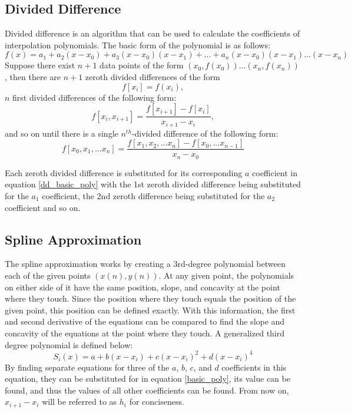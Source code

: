 \documentclass[12pt, letterpaper]{article} %
\begin{document}
\subsection{Divided Difference}
Divided difference is an algorithm that can be used to calculate the coefficients of interpolation polynomials. The basic form of the polynomial is as follows:
\begin{equation}
f(x) = a_1 + a_2(x - x_0) + a_3(x - x_0)(x - x_1) + ... + a_n(x - x_0)(x - x_1)...(x - x_n)
\label{dd_basic_poly}
\end{equation}
Suppose there exist $n+1$ data points of the form $(x_0, f(x_0)) ... (x_n, f(x_n))$, then there are $n+1$ zeroth divided differences of the form 
\begin{equation}
f[x_i]=f(x_i),
\end{equation}
$n$ first divided differences of the following form:
\begin{equation}
f[x_i, x_{i+1}]=\dfrac{f[x_{i+1}] - f[x_i]}{x_{i+1} - x_i},
\label{dd_2nd}
\end{equation}
and so on until there is a single $n^{th}$-divided difference of the following form:
\begin{equation}
f[x_0, x_1, ...x _n]=\dfrac{f[x_1, x_2, ... x_n] - f[x_0, ... x_{n-1}]}{x_n - x_0}
\label{dd_3rd}
\end{equation}

Each zeroth divided difference is substituted for its corresponding $a$ coefficient in equation \ref{dd_basic_poly} with the 1st zeroth divided difference being substituted for the $a_1$ coefficient, the 2nd zeroth difference being substituted for the $a_2$ coefficient and so on.

\subsection{Spline Approximation}
The spline approximation works by creating a 3rd-degree polynomial between each of the given points \((x(n), y(n))\). At any given point, the polynomials on either side of it have the same position, slope, and concavity at the point where they touch. Since the position where they touch equals the position of the given point, this position can be defined exactly. With this information, the first and second derivative of the equations can be compared to find the slope and concavity of the equations at the point where they touch. A generalized third degree polynomial is defined below:
\begin{equation}
S_i(x) = a + b(x - x_i) + c(x - x_i)^2 + d(x - x_i)^4
\label{basic_poly}
\end{equation}
By finding separate equations for three of the $a$, $b$, $c$, and $d$ coefficients in this equation, they can be substituted for in equation \ref{basic_poly}, its value can be found, and thus the values of all other coefficients can be found.
From now on, \(x_{i + 1} - x_i\) will be referred to as \(h_i\) for conciseness.
\end{document}
